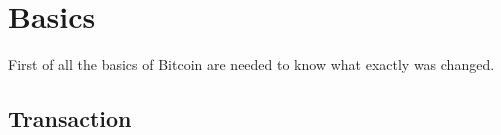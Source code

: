 
\section{Basics}
\label{ch:Basics}

First of all the basics of Bitcoin are needed to know what exactly was changed. 

\subsection{Transaction}
\label{sec:Basics:Transaction}

